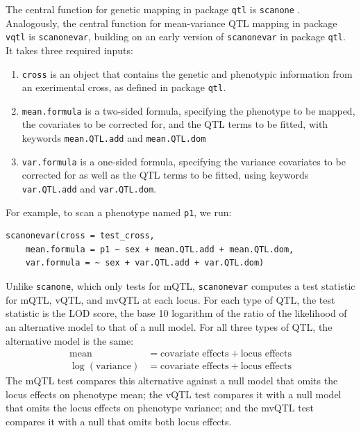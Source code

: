 \documentclass[9pt,twocolumn,twoside]{gsag3jnl}
\begin{document}
The central function for genetic mapping in package \texttt{qtl} is \texttt{scanone} \citep{Broman2003}.
Analogously, the central function for mean-variance QTL mapping in package \texttt{vqtl} is \texttt{scanonevar}, building on an early version of \texttt{scanonevar} in package \texttt{qtl}.
It takes three required inputs:
\begin{enumerate}
    \item \texttt{cross} is an object that contains the genetic and phenotypic information from an exerimental cross, as defined in package \texttt{qtl}.
    \item \texttt{mean.formula} is a two-sided formula, specifying the phenotype to be mapped, the covariates to be corrected for, and the QTL terms to be fitted, with keywords \texttt{mean.QTL.add} and \texttt{mean.QTL.dom}
    \item \texttt{var.formula} is a one-sided formula, specifying the variance covariates to be corrected for as well as the QTL terms to be fitted, using keywords \texttt{var.QTL.add} and \texttt{var.QTL.dom}.
\end{enumerate}
For example, to scan a phenotype named \texttt{p1}, we run:
\begin{verbatim}
scanonevar(cross = test_cross,
    mean.formula = p1 ~ sex + mean.QTL.add + mean.QTL.dom,
    var.formula = ~ sex + var.QTL.add + var.QTL.dom)
\end{verbatim}

Unlike \texttt{scanone}, which only tests for mQTL, \texttt{scanonevar} computes a test statistic for mQTL, vQTL, and mvQTL at each locus.
For each type of QTL, the test statistic is the LOD score, the base 10 logarithm of the ratio of the likelihood of an alternative model to that of a null model.
For all three types of QTL, the alternative model is the same:
\begin{align*}
    \text{mean} &= \text{covariate effects} + \text{locus effects}\\
    \log(\text{variance}) &= \text{covariate effects} + \text{locus effects}    
\end{align*}
The mQTL test compares this alternative against a null model that omits the locus effects on phenotype mean; the vQTL test compares it with a null model that omits the locus effects on phenotype variance; and the mvQTL test compares it with a null that omits both locus effects.
\end{document}
